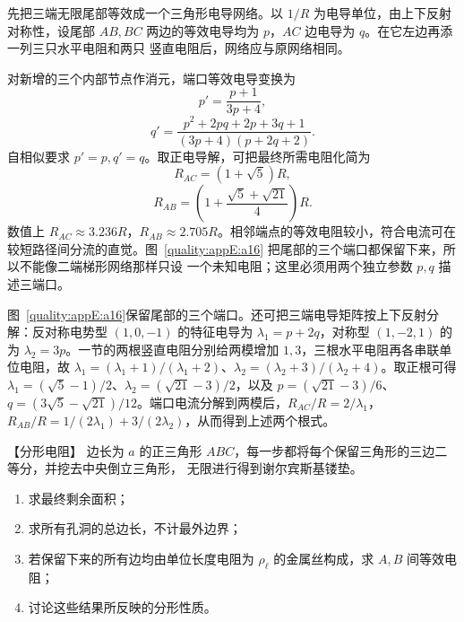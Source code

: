 \begin{xesolution}
先把三端无限尾部等效成一个三角形电导网络。以 $1/R$ 为电导单位，由上下反射对称性，设尾部
$AB,BC$ 两边的等效电导均为 $p$，$AC$ 边电导为 $q$。在它左边再添一列三只水平电阻和两只
竖直电阻后，网络应与原网络相同。

对新增的三个内部节点作消元，端口等效电导变换为
\begin{equation}
  p'=\frac{p+1}{3p+4},
\end{equation}
\begin{equation}
  q'=\frac{p^2+2pq+2p+3q+1}{(3p+4)(p+2q+2)}.
\end{equation}
自相似要求 $p'=p, q'=q$。取正电导解，可把最终所需电阻化简为
\begin{equation}
  \boxed{R_{AC}=(1+\sqrt5)R},
\end{equation}
\begin{equation}
  \boxed{R_{AB}=\left(1+\frac{\sqrt5+\sqrt{21}}4\right)R}.
\end{equation}
数值上 $R_{AC}\approx3.236R$，$R_{AB}\approx2.705R$。相邻端点的等效电阻较小，符合电流可在
较短路径间分流的直觉。图~\ref{quality:appE:a16} 把尾部的三个端口都保留下来，所以不能像二端梯形网络那样只设
一个未知电阻；这里必须用两个独立参数 $p,q$ 描述三端口。


图~\ref{quality:appE:a16}保留尾部的三个端口。还可把三端电导矩阵按上下反射分解：反对称电势型 $(1,0,-1)$ 的特征电导为 $\lambda_1=p+2q$，对称型 $(1,-2,1)$ 的为 $\lambda_2=3p$。一节的两根竖直电阻分别给两模增加 $1,3$，三根水平电阻再各串联单位电阻，故 $\lambda_1=(\lambda_1+1)/(\lambda_1+2)$、$\lambda_2=(\lambda_2+3)/(\lambda_2+4)$。取正根可得 $\lambda_1=(\sqrt5-1)/2$、$\lambda_2=(\sqrt{21}-3)/2$，以及 $p=(\sqrt{21}-3)/6$、$q=(3\sqrt5-\sqrt{21})/12$。端口电流分解到两模后，$R_{AC}/R=2/\lambda_1$，$R_{AB}/R=1/(2\lambda_1)+3/(2\lambda_2)$，从而得到上述两个根式。
\end{xesolution}

\begin{origexamplebox}{【分形电阻】}\label{appE:ex:s23-34-10}
边长为 $a$ 的正三角形 $ABC$，每一步都将每个保留三角形的三边二等分，并挖去中央倒立三角形，
无限进行得到谢尔宾斯基镂垫。
\begin{enumerate}[label=(\arabic*),leftmargin=2.2em]
  \item 求最终剩余面积；
  \item 求所有孔洞的总边长，不计最外边界；
  \item 若保留下来的所有边均由单位长度电阻为 $\rho_\ell$ 的金属丝构成，求 $A,B$ 间等效电阻；
  \item 讨论这些结果所反映的分形性质。
\end{enumerate}

\end{origexamplebox}

